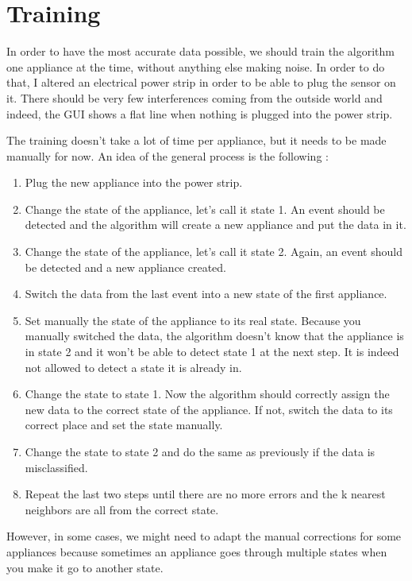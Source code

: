 \section{Training}
In order to have the most accurate data possible, we should train the algorithm one appliance at the time, without anything else making noise. In order to do that, I altered an electrical power strip in order to be able to plug the sensor on it. There should be very few interferences coming from the outside world and indeed, the GUI shows a flat line when nothing is plugged into the power strip.

The training doesn't take a lot of time per appliance, but it needs to be made manually for now. An idea of the general process is the following :
\begin{enumerate}
    \item Plug the new appliance into the power strip.
    \item Change the state of the appliance, let's call it state 1. An event should be detected and the algorithm will create a new appliance and put the data in it.
    \item Change the state of the appliance, let's call it state 2. Again, an event should be detected and a new appliance created.
    \item Switch the data from the last event into a new state of the first appliance.
    \item Set manually the state of the appliance to its real state. Because you manually switched the data, the algorithm doesn't know that the appliance is in state 2 and it won't be able to detect state 1 at the next step. It is indeed not allowed to detect a state it is already in.
    \item Change the state to state 1. Now the algorithm should correctly assign the new data to the correct state of the appliance. If not, switch the data to its correct place and set the state manually.
    \item Change the state to state 2 and do the same as previously if the data is misclassified.
    \item Repeat the last two steps until there are no more errors and the k nearest neighbors are all from the correct state.
\end{enumerate}

However, in some cases, we might need to adapt the manual corrections for some appliances because sometimes an appliance goes through multiple states when you make it go to another state.

